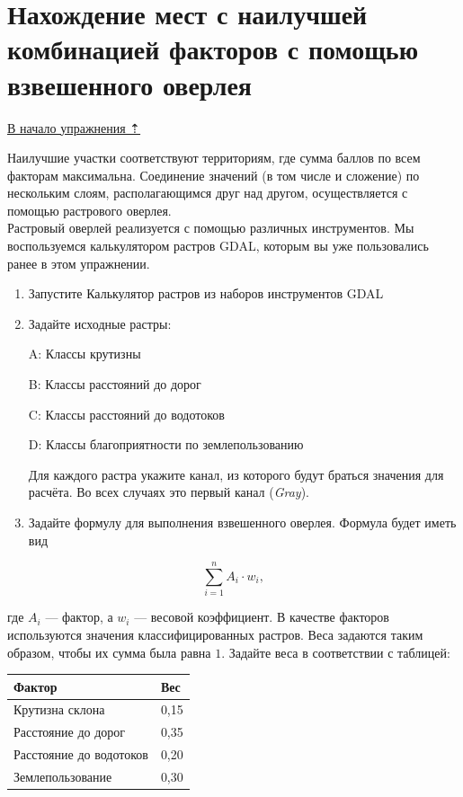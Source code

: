 \documentclass[
  12pt,
]{book}
\begin{document}
\hypertarget{weighted-overlay-combination}{%
\section{Нахождение мест с наилучшей комбинацией факторов с помощью взвешенного оверлея}\label{weighted-overlay-combination}}

\protect\hyperlink{weighted-overlay}{В начало упражнения ⇡}

Наилучшие участки соответствуют территориям, где сумма баллов по всем факторам максимальна. Соединение значений (в том числе и сложение) по нескольким слоям, располагающимся друг над другом, осуществляется с помощью растрового оверлея.\\
Растровый оверлей реализуется с помощью различных инструментов. Мы воспользуемся калькулятором растров GDAL, которым вы уже пользовались ранее в этом упражнении.

\begin{enumerate}
\def\labelenumi{\arabic{enumi}.}
\item
  Запустите Калькулятор растров из наборов инструментов GDAL
\item
  Задайте исходные растры:

  A: Классы крутизны

  B: Классы расстояний до дорог

  C: Классы расстояний до водотоков

  D: Классы благоприятности по землепользованию

  Для каждого растра укажите канал, из которого будут браться значения для расчёта. Во всех случаях это первый канал (\emph{Gray}).
\item
  Задайте формулу для выполнения взвешенного оверлея. Формула будет иметь вид
\end{enumerate}

\[\sum_{i=1}^n A_i \cdot w_i,\]

где \(A_i\) --- фактор, а \(w_i\) --- весовой коэффициент. В качестве факторов используются значения классифицированных растров. Веса задаются таким образом, чтобы их сумма была равна \(1\). Задайте веса в соответствии с таблицей:

\begin{longtable}[]{@{}ll@{}}
\toprule
Фактор & Вес\tabularnewline
\midrule
\endhead
Крутизна склона & 0,15\tabularnewline
Расстояние до дорог & 0,35\tabularnewline
Расстояние до водотоков & 0,20\tabularnewline
Землепользование & 0,30\tabularnewline
\bottomrule
\end{longtable}
\end{document}
